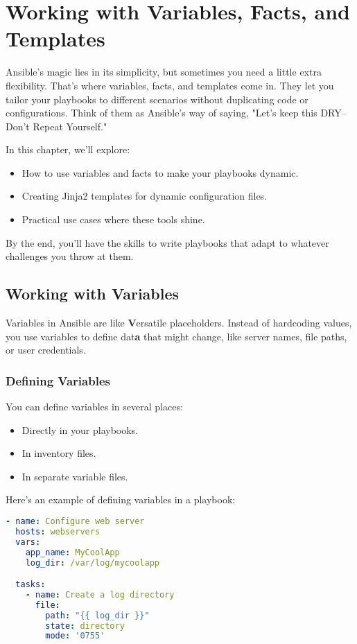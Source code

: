 \chapter{Working with Variables, Facts, and Templates}

Ansible's magic lies in its simplicity, but sometimes you need a little extra flexibility. That's where variables, facts, and templates come in. They let you tailor your playbooks to different scenarios without duplicating code or configurations. Think of them as Ansible's way of saying, "Let's keep this DRY--Don't Repeat Yourself."

In this chapter, we'll explore:
\begin{itemize}
    \item How to use variables and facts to make your playbooks dynamic.
    \item Creating Jinja2 templates for dynamic configuration files.
    \item Practical use cases where these tools shine.
\end{itemize}

By the end, you'll have the skills to write playbooks that adapt to whatever challenges you throw at them.


\section{Working with Variables}

Variables in Ansible are like \textbf{V}ersatile placeholders. Instead of hardcoding values, you use variables to define dat\textbf{a} that might change, like server names, file paths, or user credentials.

\subsection{Defining Variables}

You can define variables in several places:
\begin{itemize}
    \item Directly in your playbooks.
    \item In inventory files.
    \item In separate variable files.
\end{itemize}

Here's an example of defining variables in a playbook:
\begin{lstlisting}[language=yaml, caption=Defining Variables in a Playbook]
- name: Configure web server
  hosts: webservers
  vars:
    app_name: MyCoolApp
    log_dir: /var/log/mycoolapp

  tasks:
    - name: Create a log directory
      file:
        path: "{{ log_dir }}"
        state: directory
        mode: '0755'
\end{lstlisting}

